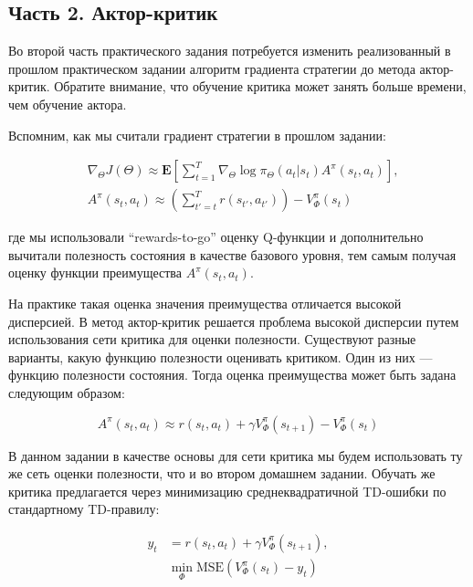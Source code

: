 \documentclass[12pt, oneside]{article}
\begin{document}
\subsection{Часть 2. Актор-критик}

Во второй часть практического задания потребуется изменить реализованный в прошлом практическом задании алгоритм градиента стратегии до метода актор-критик. Обратите внимание, что обучение критика может занять больше времени, чем обучение актора.

Вспомним, как мы считали градиент стратегии в прошлом задании:

\begin{align}
    &\nabla_{\Theta} J(\Theta) \approx \mathbf{E} \left[ \sum_{t=1}^T \nabla_{\Theta} \log \pi_{\Theta} (a_t | s_t) A^{\pi}(s_t, a_t) \right], \\
    &A^{\pi}(s_t, a_t) \approx \left( \sum_{t'=t}^T r(s_{t'}, a_{t'}) \right) - V_{\Phi}^{\pi}(s_t)
\end{align}

\noindent
где мы использовали ``rewards-to-go'' оценку Q-функции и дополнительно вычитали полезность состояния в качестве базового уровня, тем самым получая оценку функции преимущества $A^{\pi}(s_t, a_t)$.

На практике такая оценка значения преимущества отличается высокой дисперсией. В метод актор-критик решается проблема высокой дисперсии путем использования сети критика для оценки полезности. Существуют разные варианты, какую функцию полезности оценивать критиком. Один из них --- функцию полезности состояния. Тогда оценка преимущества может быть задана следующим образом:

\begin{equation}
    A^{\pi}(s_t, a_t) \approx r(s_t, a_t) + \gamma V_{\Phi}^{\pi}(s_{t+1}) - V_{\Phi}^{\pi}(s_t)
\end{equation}

В данном задании в качестве основы для сети критика мы будем использовать ту же сеть оценки полезности, что и во втором домашнем задании. Обучать же критика предлагается через минимизацию среднеквадратичной TD-ошибки по стандартному TD-правилу:

\begin{align}
    y_t &= r(s_t, a_t) + \gamma V_{\Phi}^{\pi}(s_{t+1}), \\
    &\min_{\Phi} \text{MSE} (V_{\Phi}^{\pi}(s_t) - y_t)
\end{align}
\end{document}
